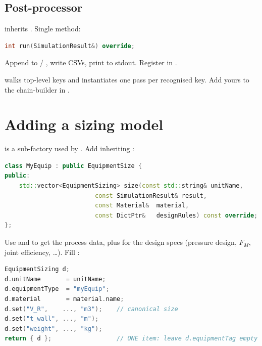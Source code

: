 \documentclass[11pt,a4paper]{article}
\begin{document}
\subsection{Post-processor}

 inherits .
Single method:

\begin{lstlisting}[language=C++]
int run(SimulationResult&) override;
\end{lstlisting}

Append to  / , write CSVs,
print to stdout. Register in .

 walks 
top-level keys and instantiates one pass per recognised key. Add yours
to the chain-builder in .

\section{Adding a sizing model}

 is a sub-factory used by . Add
 inheriting
:

\begin{lstlisting}[language=C++]
class MyEquip : public EquipmentSize {
public:
    std::vector<EquipmentSizing> size(const std::string& unitName,
                         const SimulationResult& result,
                         const Material&  material,
                         const DictPtr&   designRules) const override;
};
\end{lstlisting}

Use  and
 to get the process data, plus
 for the design specs (pressure design, $F_M$, joint
efficiency, \dots). Fill :

\begin{lstlisting}[language=C++]
EquipmentSizing d;
d.unitName       = unitName;
d.equipmentType  = "myEquip";
d.material       = material.name;
d.set("V_R",    ..., "m3");    // canonical size
d.set("t_wall", ..., "m");
d.set("weight", ..., "kg");
return { d };                  // ONE item: leave d.equipmentTag empty
\end{lstlisting}
\end{document}
